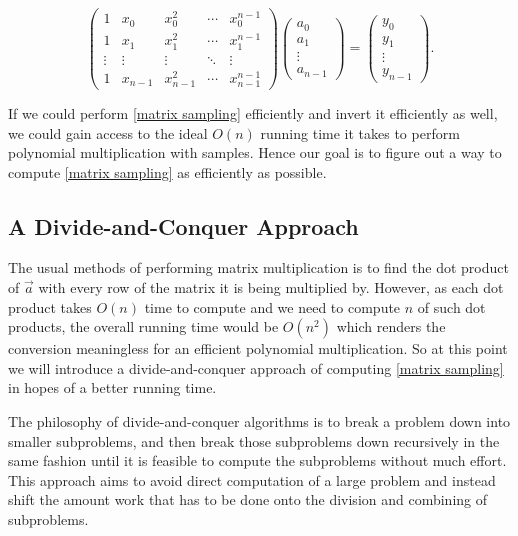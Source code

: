 \documentclass[../article.tex]{subfiles}
\begin{document}
\begin{equation} \label{matrix sampling}
		\begin{pmatrix}
		1 & x_0 & x_0^2 & \cdots & x_0^{n-1}\\
		1 & x_1 & x_1^2& \cdots & x_1^{n-1}\\
		\vdots & \vdots & \vdots & \ddots & \vdots\\
		1 & x_{n-1}  & x_{n-1}^{2}& \cdots & x_{n-1}^{n-1}
		\end{pmatrix}
		\begin{pmatrix}
		a_0\\
		a_1\\
		\vdots\\
		a_{n-1}
		\end{pmatrix}
		=
		\begin{pmatrix}
		y_0\\
		y_1\\
		\vdots\\
		y_{n-1}
		\end{pmatrix}.
\end{equation}

If we could perform \eqref{matrix sampling} efficiently and invert it efficiently as well, we could gain access to the ideal $O(n)$ running time it takes to perform polynomial multiplication with samples. Hence our goal is to figure out a way to compute \eqref{matrix sampling} as efficiently as possible.

\subsection{A Divide-and-Conquer Approach}
The usual methods of performing matrix multiplication is to find the dot product of $\vec{a}$ with every row of the matrix it is being multiplied by. However, as each dot product takes $O(n)$ time to compute and we need to compute $n$ of such dot products, the overall running time would be $O(n^2)$ which renders the conversion meaningless for an efficient polynomial multiplication. So at this point we will introduce a divide-and-conquer approach of computing \eqref{matrix sampling} in hopes of a better running time.

The philosophy of divide-and-conquer algorithms is to break a problem down into smaller subproblems, and then break those subproblems down recursively in the same fashion until it is feasible to compute the subproblems without much effort. This approach aims to avoid direct computation of a large problem and instead shift the amount work that has to be done onto the division and combining of subproblems.
\end{document}
